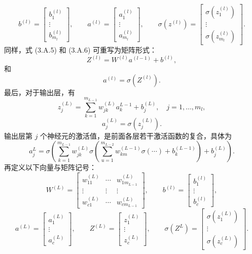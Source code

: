 \[
b^{(l)}=\begin{bmatrix}b_1^{(l)}\\\vdots\\b_{m_l}^{(l)}\end{bmatrix},\qquad
a^{(l)}=\begin{bmatrix}a_1^{(l)}\\\vdots\\a_{m_l}^{(l)}\end{bmatrix},\qquad
\sigma(z^{(l)})=\begin{bmatrix}\sigma(z_1^{(l)})\\\vdots\\\sigma(z_{m_l}^{(l)})\end{bmatrix}.
\]
同样，式 (3.A.5) 和 (3.A.6) 可重写为矩阵形式：
\begin{equation}
Z^{(l)}=W^{(l)}a^{(l-1)}+b^{(l)},
\tag{3.A.7}
\end{equation}
和
\begin{equation}
a^{(l)}=\sigma(Z^{(l)}).
\tag{3.A.8}
\end{equation}
最后，对于输出层，有
\begin{equation}
z_j^{(L)}=\sum_{k=1}^{m_{L-1}}w_{jk}^{(L)}a_k^{L-1}+b_j^{(L)},\quad j=1,\ldots,m_l,
\tag{3.A.9}
\end{equation}
\begin{equation}
a_j^{(L)}=\sigma(z_j^{(L)}).
\tag{3.A.10}
\end{equation}
输出层第 $j$ 个神经元的激活值，是前面各层若干激活函数的复合，具体为
\begin{equation}
a_j^L=\sigma\left(\sum_{k=1}^{m_{L-1}}w_{jk}^{(L)}
\sigma\left(\sum_{u=1}^{m_{L-2}}w_{km}^{(L-1)}\sigma(\cdots)+b_k^{(L-1)}\right)
+b_j^{(L)}\right).
\tag{3.A.11}
\end{equation}
再定义以下向量与矩阵记号：
\[
W^{(L)}=\begin{bmatrix}
w_{11}^{(L)}&\cdots&w_{1m_{L-1}}^{(L)}\\
\vdots&\vdots&\vdots\\
w_{c1}^{(L)}&\cdots&w_{cm_{L-1}}^{(L)}
\end{bmatrix},\qquad
b^{(l)}=\begin{bmatrix}b_1^{(l)}\\\vdots\\b_c^{(l)}\end{bmatrix},
\]
\[
a^{(L)}=\begin{bmatrix}a_1^{(L)}\\\vdots\\a_c^{(L)}\end{bmatrix},\qquad
Z^{(L)}=\begin{bmatrix}z_1^{(L)}\\\vdots\\z_c^{(L)}\end{bmatrix},\qquad
\sigma(Z^L)=\begin{bmatrix}\sigma(z_1^{(L)})\\\vdots\\\sigma(z_c^{(L)})\end{bmatrix}.
\]

